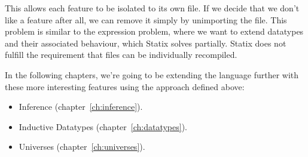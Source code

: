This allows each feature to be isolated to its own file. If we decide that we don't like a feature after all, we can remove it simply by unimporting the file. This problem is similar to the expression problem\cite{expression_problem, extensability}, where we want to extend datatypes and their associated behaviour, which Statix solves partially. Statix does not fulfill the requirement that files can be individually recompiled.

In the following chapters, we're going to be extending the language further with these more interesting features using the approach defined above:
\begin{itemize}
	\item Inference (chapter~\ref{ch:inference}).
	\item Inductive Datatypes (chapter~\ref{ch:datatypes}).
	\item Universes (chapter~\ref{ch:universes}).
\end{itemize}

